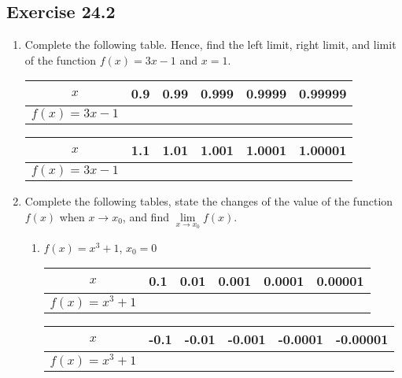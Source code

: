 \documentclass[12pt]{report}
\begin{document}
\subsection*{Exercise 24.2}

\begin{enumerate}
  \item Complete the following table. Hence, find the left limit, right limit, and
        limit of the function $f(x) = 3x - 1$ and $x = 1$.
        \begin{center}
          \begin{tabular}{|c|c|c|c|c|c|}
            \hline
            $x$             & 0.9 & 0.99 & 0.999 & 0.9999 & 0.99999 \\
            \hline
            $f(x) = 3x - 1$ &     &      &       &        &         \\
            \hline
          \end{tabular}
          \vskip 0.2cm
          \begin{tabular}{|c|c|c|c|c|c|}
            \hline
            $x$             & 1.1 & 1.01 & 1.001 & 1.0001 & 1.00001 \\
            \hline
            $f(x) = 3x - 1$ &     &      &       &        &         \\
            \hline
          \end{tabular}
        \end{center}

  \item Complete the following tables, state the changes of the value of the function
        $f(x)$ when $x \to x_0$, and find $\lim\limits_{x \to x_0} f(x)$.
        \begin{enumerate}
          \item $f(x) = x^3 + 1$, $x_0 = 0$
                \begin{center}
                  \begin{tabular}{|c|c|c|c|c|c|}
                    \hline
                    $x$              & 0.1 & 0.01 & 0.001 & 0.0001 & 0.00001 \\
                    \hline
                    $f(x) = x^3 + 1$ &     &      &       &        &         \\
                    \hline
                  \end{tabular}
                  \vskip 0.2cm
                  \begin{tabular}{|c|c|c|c|c|c|}
                    \hline
                    $x$              & -0.1 & -0.01 & -0.001 & -0.0001 & -0.00001 \\
                    \hline
                    $f(x) = x^3 + 1$ &      &       &        &         &          \\
                    \hline
                  \end{tabular}
                \end{center}


\end{enumerate}
\end{enumerate}
\end{document}
